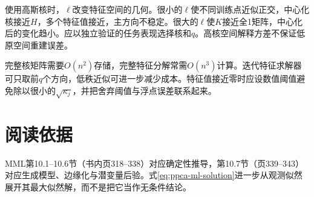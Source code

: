 使用高斯核时，$\ell$改变特征空间的几何。很小的$\ell$使不同训练点近似正交，中心化核接近$H$，多个特征值接近，主方向不稳定。很大的$\ell$使$K$接近全1矩阵，中心化后的变化趋小。应以独立验证的任务表现选择核和$q$。高核空间解释方差不保证低原空间重建误差。

完整核矩阵需要$O(n^2)$存储，完整特征分解常需$O(n^3)$计算。迭代特征求解器可只取前$q$个方向，低秩近似可进一步减少成本。特征值接近零时应设数值阈值避免除以很小的$\sqrt{\kappa_j}$，并把舍弃阈值与浮点误差联系起来。


\section{阅读依据}
MML第10.1--10.6节（书内页318--338）对应确定性推导，第10.7节（页339--343）对应生成模型、边缘化与潜变量后验。式\eqref{eq:ppca-ml-solution}进一步从观测似然展开其最大似然解，而不是把它当作无条件结论。
